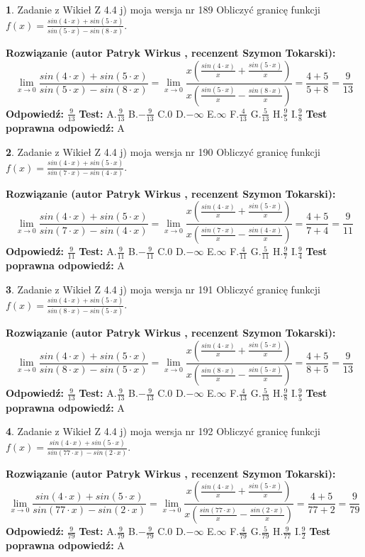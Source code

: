 \documentclass[12pt, a4paper]{article}
\theoremstyle{definition} %
\newtheorem{zad}{}
\newcommand{\zadStart}[1]{\begin{zad}#1\newline}
\newcommand{\zadStop}{\end{zad}}
\newcommand{\rozwStart}[2]{\noindent \textbf{Rozwiązanie (autor #1 , recenzent #2): }\newline}
\newcommand{\rozwStop}{\newline}
\newcommand{\odpStart}{\noindent \textbf{Odpowiedź:}\newline}
\newcommand{\odpStop}{\newline}
\newcommand{\testStart}{\noindent \textbf{Test:}\newline}
\newcommand{\testStop}{\newline}
\newcommand{\kluczStart}{\noindent \textbf{Test poprawna odpowiedź:}\newline}
\newcommand{\kluczStop}{\newline}
\begin{document}
\zadStart{Zadanie z Wikieł Z 4.4 j) moja wersja nr 189}
Obliczyć granicę funkcji $f(x)=\frac{sin(4\cdot x) +sin(5\cdot x)}{sin(5\cdot x) -sin(8\cdot x)}$.
\zadStop
\rozwStart{Patryk Wirkus}{Szymon Tokarski}
$$\lim\limits_{x\to 0}\frac{sin(4\cdot x) +sin(5\cdot x)}{sin(5\cdot x) -sin(8\cdot x)}=\lim\limits_{x\to 0}\frac{x(\frac{sin(4\cdot x)}{x}+\frac{sin(5\cdot x)}{x})}{x(\frac{sin(5\cdot x)}{x}-\frac{sin(8\cdot x)}{x})}=\frac{4+5}{5+8} = \frac{9}{13}$$
\rozwStop
\odpStart
$\frac{9}{13}$
\odpStop
\testStart
A.$\frac{9}{13}$
B.$-\frac{9}{13}$
C.$0$
D.$-\infty$
E.$\infty$
F.$\frac{4}{13}$
G.$\frac{5}{13}$
H.$\frac{9}{5}$
I.$\frac{9}{8}$
\testStop
\kluczStart
A
\kluczStop



\zadStart{Zadanie z Wikieł Z 4.4 j) moja wersja nr 190}
Obliczyć granicę funkcji $f(x)=\frac{sin(4\cdot x) +sin(5\cdot x)}{sin(7\cdot x) -sin(4\cdot x)}$.
\zadStop
\rozwStart{Patryk Wirkus}{Szymon Tokarski}
$$\lim\limits_{x\to 0}\frac{sin(4\cdot x) +sin(5\cdot x)}{sin(7\cdot x) -sin(4\cdot x)}=\lim\limits_{x\to 0}\frac{x(\frac{sin(4\cdot x)}{x}+\frac{sin(5\cdot x)}{x})}{x(\frac{sin(7\cdot x)}{x}-\frac{sin(4\cdot x)}{x})}=\frac{4+5}{7+4} = \frac{9}{11}$$
\rozwStop
\odpStart
$\frac{9}{11}$
\odpStop
\testStart
A.$\frac{9}{11}$
B.$-\frac{9}{11}$
C.$0$
D.$-\infty$
E.$\infty$
F.$\frac{4}{11}$
G.$\frac{5}{11}$
H.$\frac{9}{7}$
I.$\frac{9}{4}$
\testStop
\kluczStart
A
\kluczStop



\zadStart{Zadanie z Wikieł Z 4.4 j) moja wersja nr 191}
Obliczyć granicę funkcji $f(x)=\frac{sin(4\cdot x) +sin(5\cdot x)}{sin(8\cdot x) -sin(5\cdot x)}$.
\zadStop
\rozwStart{Patryk Wirkus}{Szymon Tokarski}
$$\lim\limits_{x\to 0}\frac{sin(4\cdot x) +sin(5\cdot x)}{sin(8\cdot x) -sin(5\cdot x)}=\lim\limits_{x\to 0}\frac{x(\frac{sin(4\cdot x)}{x}+\frac{sin(5\cdot x)}{x})}{x(\frac{sin(8\cdot x)}{x}-\frac{sin(5\cdot x)}{x})}=\frac{4+5}{8+5} = \frac{9}{13}$$
\rozwStop
\odpStart
$\frac{9}{13}$
\odpStop
\testStart
A.$\frac{9}{13}$
B.$-\frac{9}{13}$
C.$0$
D.$-\infty$
E.$\infty$
F.$\frac{4}{13}$
G.$\frac{5}{13}$
H.$\frac{9}{8}$
I.$\frac{9}{5}$
\testStop
\kluczStart
A
\kluczStop



\zadStart{Zadanie z Wikieł Z 4.4 j) moja wersja nr 192}
Obliczyć granicę funkcji $f(x)=\frac{sin(4\cdot x) +sin(5\cdot x)}{sin(77\cdot x) -sin(2\cdot x)}$.
\zadStop
\rozwStart{Patryk Wirkus}{Szymon Tokarski}
$$\lim\limits_{x\to 0}\frac{sin(4\cdot x) +sin(5\cdot x)}{sin(77\cdot x) -sin(2\cdot x)}=\lim\limits_{x\to 0}\frac{x(\frac{sin(4\cdot x)}{x}+\frac{sin(5\cdot x)}{x})}{x(\frac{sin(77\cdot x)}{x}-\frac{sin(2\cdot x)}{x})}=\frac{4+5}{77+2} = \frac{9}{79}$$
\rozwStop
\odpStart
$\frac{9}{79}$
\odpStop
\testStart
A.$\frac{9}{79}$
B.$-\frac{9}{79}$
C.$0$
D.$-\infty$
E.$\infty$
F.$\frac{4}{79}$
G.$\frac{5}{79}$
H.$\frac{9}{77}$
I.$\frac{9}{2}$
\testStop
\kluczStart
A
\kluczStop
\end{document}
